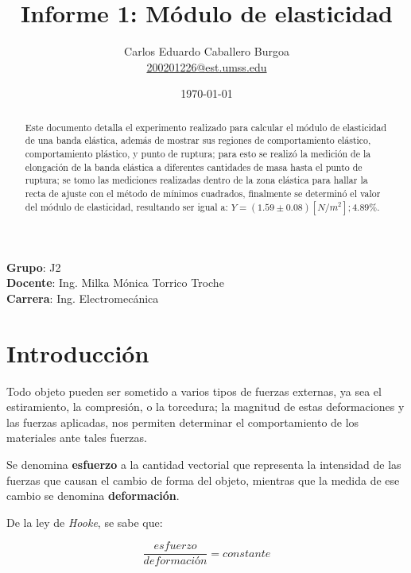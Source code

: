 \documentclass[letter,11pt]{article}
\title{Informe 1: Módulo de elasticidad}
\author{Carlos Eduardo Caballero Burgoa \\
    \small{\href{mailto:200201226@est.umss.edu}{200201226@est.umss.edu}}
}
\date{\today}
\begin{document}
\maketitle
\begin{center}
    \textbf{Grupo}: J2\\
    \textbf{Docente}: Ing. Milka Mónica Torrico Troche\\
    \textbf{Carrera}: Ing. Electromecánica
\end{center}

\begin{abstract}
Este documento detalla el experimento realizado para calcular el módulo de
elasticidad de una banda elástica, además de mostrar sus regiones de
comportamiento elástico, comportamiento plástico, y punto de ruptura; para esto
se realizó la medición de la elongación de la banda elástica a diferentes
cantidades de masa hasta el punto de ruptura; se tomo las mediciones realizadas
dentro de la zona elástica para hallar la recta de ajuste con el método de
mínimos cuadrados, finalmente se determinó el valor del módulo de elasticidad,
resultando ser igual a: $Y = (1.59 \pm 0.08)[N/m^2]; 4.89\%$.
\end{abstract}

\section{Introducción}

Todo objeto pueden ser sometido a varios tipos de fuerzas externas, ya sea el
estiramiento, la compresión, o la torcedura; la magnitud de estas deformaciones
y las fuerzas aplicadas, nos permiten determinar el comportamiento de los
materiales ante tales fuerzas.

Se denomina \textbf{esfuerzo} a la cantidad vectorial que representa la
intensidad de las fuerzas que causan el cambio de forma del objeto, mientras que
la medida de ese cambio se denomina \textbf{deformación}.

De la ley de \emph{Hooke}, se sabe que:

\begin{equation}
    \frac{esfuerzo}{deformación} = constante
\label{hooke}
\end{equation}
\vspace{0.10cm}
\end{document}
